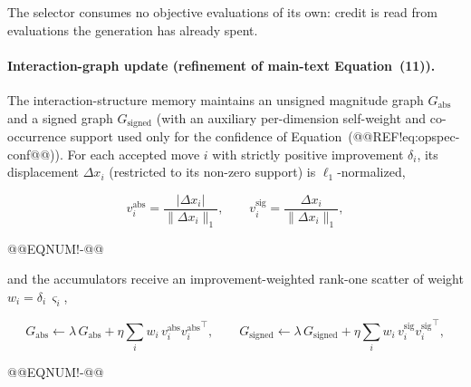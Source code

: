 \documentclass[10pt,a4paper]{article}
\begin{document}
\noindent The selector consumes no objective evaluations of its own: credit is
read from evaluations the generation has already spent.



\paragraph{Interaction-graph update (refinement of main-text Equation~(11)).}
The interaction-structure memory maintains an unsigned magnitude graph
$G_{\mathrm{abs}}$ and a signed graph $G_{\mathrm{signed}}$ (with an auxiliary
per-dimension self-weight and co-occurrence support used only for the confidence
of Equation~(@@REF!eq:opspec-conf@@)).  For each accepted move $i$ with strictly
positive improvement $\delta_i$, its displacement $\Delta x_i$ (restricted to
its non-zero support) is $\ell_1$-normalized,

\[
v^{\mathrm{abs}}_i = \frac{\lvert \Delta x_i\rvert}{\lVert \Delta x_i\rVert_1},
\qquad
v^{\mathrm{sig}}_i = \frac{\Delta x_i}{\lVert \Delta x_i\rVert_1},
\]

@@EQNUM!-@@

and the accumulators receive an improvement-weighted rank-one scatter of weight
$w_i=\delta_i\,\varsigma_i$,

\[
G_{\mathrm{abs}} \leftarrow \lambda\,G_{\mathrm{abs}}
 + \eta\sum_i w_i\, v^{\mathrm{abs}}_i {v^{\mathrm{abs}}_i}^{\!\top},
\qquad
G_{\mathrm{signed}} \leftarrow \lambda\,G_{\mathrm{signed}}
 + \eta\sum_i w_i\, v^{\mathrm{sig}}_i {v^{\mathrm{sig}}_i}^{\!\top},
\]

@@EQNUM!-@@
\end{document}
